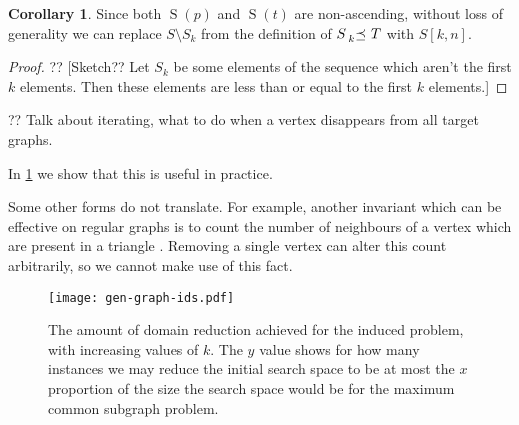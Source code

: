 \documentclass[letterpaper]{article}
\theoremstyle{definition}
\newtheorem{corollary}{Corollary}
\newcommand{\lesspreceq}[1]{\prescript{}{#1}{\preceq}\ }
\newcommand{\nds}{\operatorname{S}}
\newcommand{\todo}[1]{{\color{red} {?? [}{#1}{]}}}
\begin{document}
\begin{corollary}
Since both $\nds(p)$ and $\nds(t)$ are non-ascending, without loss of generality we can replace
$S \setminus S_k$ from the definition of $S \lesspreceq{k} T$ with $S[k, n]$.
\end{corollary}

\begin{proof}
\todo{Sketch?? Let $S_k$ be some elements of the sequence which aren't the first $k$ elements.  Then these elements are less than or equal to the first $k$ elements.}
\end{proof}



?? Talk about iterating, what to do when a vertex disappears from all target graphs.

In \cref{figure:ids} we show that this is useful in practice.

Some other forms do not translate. For example, another invariant which can be effective on regular
graphs is to count the number of neighbours of a vertex which are present in a triangle \cite{mckay2014practical}. Removing a single vertex can alter this count arbitrarily, so we cannot make use of this fact.

\begin{figure}
    \texttt{[image: gen-graph-ids.pdf]}
    \caption{The amount of domain reduction achieved for the induced problem, with increasing values
    of $k$. The $y$ value shows for how many instances we may reduce the initial search space to be
    at most the $x$ proportion of the size the search space would be for the maximum common subgraph
    problem.}\label{figure:ids}
\end{figure}
\end{document}

